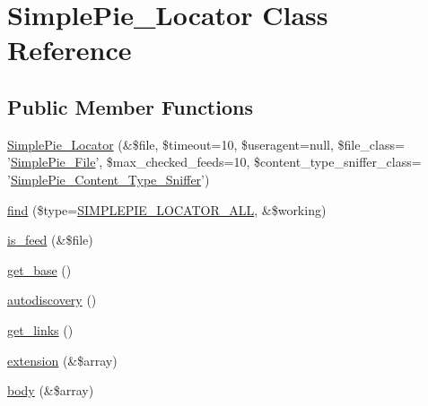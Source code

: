 \hypertarget{class_simple_pie___locator}{\section{Simple\-Pie\-\_\-\-Locator Class Reference}
\label{class_simple_pie___locator}
}
\subsection*{Public Member Functions}
\begin{DoxyCompactItemize}
\item 
\hyperlink{class_simple_pie___locator_a252cd7632ded207e2601e6508e1e0702}{Simple\-Pie\-\_\-\-Locator} (\&\$file, \$timeout=10, \$useragent=null, \$file\-\_\-class= '\hyperlink{class_simple_pie___file}{Simple\-Pie\-\_\-\-File}', \$max\-\_\-checked\-\_\-feeds=10, \$content\-\_\-type\-\_\-sniffer\-\_\-class= '\hyperlink{class_simple_pie___content___type___sniffer}{Simple\-Pie\-\_\-\-Content\-\_\-\-Type\-\_\-\-Sniffer}')
\item 
\hyperlink{class_simple_pie___locator_a29f2ee44d995fc62f6f00554833b4bd2}{find} (\$type=\hyperlink{simplepie_8inc_a77835b708f60cde39bf93958e683a5f1}{S\-I\-M\-P\-L\-E\-P\-I\-E\-\_\-\-L\-O\-C\-A\-T\-O\-R\-\_\-\-A\-L\-L}, \&\$working)
\item 
\hyperlink{class_simple_pie___locator_a96bfa375f46dffd49fd777f125500a46}{is\-\_\-feed} (\&\$file)
\item 
\hyperlink{class_simple_pie___locator_a1f754570acae7042ad74ad0378eed269}{get\-\_\-base} ()
\item 
\hyperlink{class_simple_pie___locator_ad0de3fc2dbcf9088e760721c2d694cb1}{autodiscovery} ()
\item 
\hyperlink{class_simple_pie___locator_aa8c0740c60d195a41f3e1d5cdc6c4e05}{get\-\_\-links} ()
\item 
\hyperlink{class_simple_pie___locator_a7de54ee8eeb42eddbe9ca1e38e0a3354}{extension} (\&\$array)
\item 
\hyperlink{class_simple_pie___locator_add6fbdc243174e7c522645f5ffc79360}{body} (\&\$array)
\end{DoxyCompactItemize}
